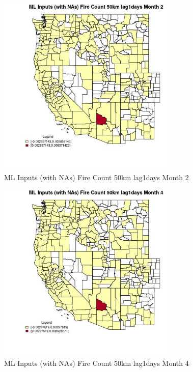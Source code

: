 \begin{figure} 
\centering  
\includegraphics[width=0.77\textwidth]{Code_Outputs/Report_ML_input_PM25_Step4_part_e_de_duplicated_aves_compiled_2019-05-20wNAs_CountyFire_Count_50km_lag1daysmedianMonth2.jpg} 
\caption{\label{fig:Report_ML_input_PM25_Step4_part_e_de_duplicated_aves_compiled_2019-05-20wNAsCountyFire_Count_50km_lag1daysmedianMonth2}ML Inputs (with NAs) Fire Count 50km lag1days Month 2} 
\end{figure} 
 

\begin{figure} 
\centering  
\includegraphics[width=0.77\textwidth]{Code_Outputs/Report_ML_input_PM25_Step4_part_e_de_duplicated_aves_compiled_2019-05-20wNAs_CountyFire_Count_50km_lag1daysmedianMonth4.jpg} 
\caption{\label{fig:Report_ML_input_PM25_Step4_part_e_de_duplicated_aves_compiled_2019-05-20wNAsCountyFire_Count_50km_lag1daysmedianMonth4}ML Inputs (with NAs) Fire Count 50km lag1days Month 4} 
\end{figure} 
 

